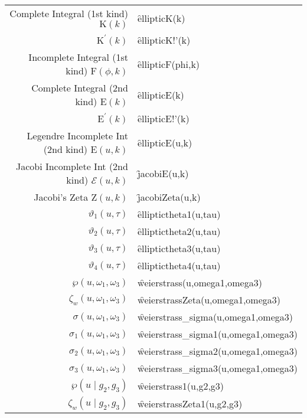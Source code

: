 {\begin{tabular}{r l}
Complete Integral (1st kind) $\mathrm{K}(k)$ & \f{ellipticK(k)}\\
$\mathrm{K}^\prime(k)$ & \f{ellipticK!'(k)}\\
Incomplete Integral (1st kind) $\mathrm{F}(\phi,k)$ & \f{ellipticF(phi,k)}\\
Complete Integral (2nd kind) $\mathrm{E}(k)$ & \f{ellipticE(k)}\\
$\mathrm{E}^\prime(k)$ & \f{ellipticE!'(k)}\\
Legendre Incomplete Int (2nd kind) $\mathrm{E}(u,k)$ & \f{ellipticE(u,k)}\\
Jacobi Incomplete Int (2nd kind) $\mathcal{E}(u,k)$ & \f{jacobiE(u,k)}\\
Jacobi's Zeta $\mathrm{Z}(u,k)$ & \f{jacobiZeta(u,k)}\\
$\vartheta_1(u,\tau)$ & \f{elliptictheta1(u,tau)}\\
$\vartheta_2(u,\tau)$ & \f{elliptictheta2(u,tau)}\\
$\vartheta_3(u,\tau)$ & \f{elliptictheta3(u,tau)}\\
$\vartheta_4(u,\tau)$ & \f{elliptictheta4(u,tau)}\\
$\wp(u,\omega_1, \omega_3)$ & \f{weierstrass(u,omega1,omega3)}\\
$\zeta_w(u,\omega_1, \omega_3)$ & \f{weierstrassZeta(u,omega1,omega3)}\\
$\sigma(u,\omega_1, \omega_3)$ & \f{weierstrass\_sigma(u,omega1,omega3)}\\
$\sigma_1(u,\omega_1, \omega_3)$ & \f{weierstrass\_sigma1(u,omega1,omega3)}\\
$\sigma_2(u,\omega_1, \omega_3)$ & \f{weierstrass\_sigma2(u,omega1,omega3)}\\
$\sigma_3(u,\omega_1, \omega_3)$ & \f{weierstrass\_sigma3(u,omega1,omega3)}\\
$\wp(u \mid g_2, g_3)$ & \f{weierstrass1(u,g2,g3)}\\
$\zeta_w(u \mid g_2, g_3)$ & \f{weierstrassZeta1(u,g2,g3)}\\[5pt]
\end{tabular}}
